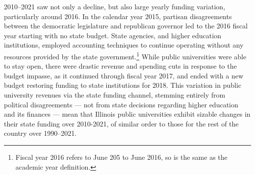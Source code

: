 2010--2021 saw not only a decline, but also large yearly funding variation, particularly around 2016.
In the calendar year 2015, partisan disagreements between the democratic legislature and republican governor led to the 2016 fiscal year starting with no state budget.
State agencies, and higher education institutions, employed accounting techniques to continue operating without any resources provided by the state government.\footnote{
    Fiscal year 2016 refers to June 205 to June 2016, so is the same as the academic year definition.
}
While public universities were able to stay open, there were drastic revenue and spending cuts in response to the budget impasse, as it continued through fiscal year 2017, and ended with a new budget restoring funding to state institutions for 2018.
This variation in public university revenues via the state funding channel, stemming entirely from political disagreements --- not from state decisions regarding higher education and its finances \citep{young2020squandered} --- mean that Illinois public universities exhibit sizable changes in their state funding over 2010-2021, of similar order to those for the rest of the country over 1990--2021.
